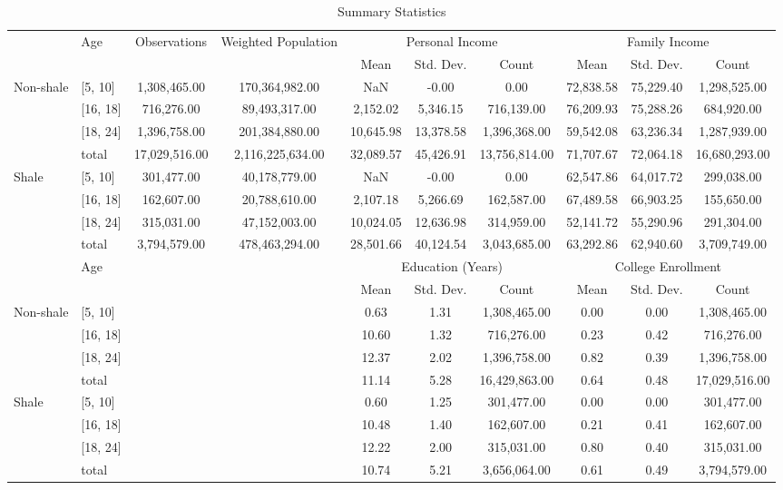 \begin{table}[ht]
\centering
\tiny
\begin{tabular}{l|l||c|c|ccc|ccc}
  \hline 
 & Age  & Observations & Weighted Population & \multicolumn{3}{c|}{Personal Income} & \multicolumn{3}{c}{Family Income} \\ 
 &  & & & Mean & Std. Dev. & Count & Mean & Std. Dev. & Count\\ 
  \hline 
   \multirow{4}{*}{Non-shale} & [5, 10] & 1,308,465.00 & 170,364,982.00 & NaN & -0.00 & 0.00 & 72,838.58 & 75,229.40 & 1,298,525.00 \\ 
   & [16, 18] & 716,276.00 & 89,493,317.00 & 2,152.02 & 5,346.15 & 716,139.00 & 76,209.93 & 75,288.26 & 684,920.00 \\ 
   & [18, 24] & 1,396,758.00 & 201,384,880.00 & 10,645.98 & 13,378.58 & 1,396,368.00 & 59,542.08 & 63,236.34 & 1,287,939.00 \\ 
   & total & 17,029,516.00 & 2,116,225,634.00 & 32,089.57 & 45,426.91 & 13,756,814.00 & 71,707.67 & 72,064.18 & 16,680,293.00 \\ 
   \multirow{4}{*}{Shale} & [5, 10] & 301,477.00 & 40,178,779.00 & NaN & -0.00 & 0.00 & 62,547.86 & 64,017.72 & 299,038.00 \\ 
   & [16, 18] & 162,607.00 & 20,788,610.00 & 2,107.18 & 5,266.69 & 162,587.00 & 67,489.58 & 66,903.25 & 155,650.00 \\ 
   & [18, 24] & 315,031.00 & 47,152,003.00 & 10,024.05 & 12,636.98 & 314,959.00 & 52,141.72 & 55,290.96 & 291,304.00 \\ 
   & total & 3,794,579.00 & 478,463,294.00 & 28,501.66 & 40,124.54 & 3,043,685.00 & 63,292.86 & 62,940.60 & 3,709,749.00 \\ 
   \hline \hline
   & Age & \multirow{10}{*}{} & \multirow{10}{*}{}& \multicolumn{3}{c|}{Education (Years)} & \multicolumn{3}{c}{College Enrollment} \\ 
  & &  & & Mean & Std. Dev. & Count  & Mean & Std. Dev. & Count  \\ 
  \hline
   \multirow{4}{*}{Non-shale} & [5, 10] & &  & 0.63 & 1.31 & 1,308,465.00 & 0.00 & 0.00 & 1,308,465.00 \\ 
   & [16, 18] & &  & 10.60 & 1.32 & 716,276.00 & 0.23 & 0.42 & 716,276.00 \\ 
   & [18, 24] &  &  & 12.37 & 2.02 & 1,396,758.00 & 0.82 & 0.39 & 1,396,758.00 \\ 
   & total &  & & 11.14 & 5.28 & 16,429,863.00 & 0.64 & 0.48 & 17,029,516.00 \\ 
   \multirow{4}{*}{Shale}& [5, 10] &  &  & 0.60 & 1.25 & 301,477.00 & 0.00 & 0.00 & 301,477.00 \\ 
   & [16, 18] &  &  & 10.48 & 1.40 & 162,607.00 & 0.21 & 0.41 & 162,607.00 \\ 
   & [18, 24] &  &  & 12.22 & 2.00 & 315,031.00 & 0.80 & 0.40 & 315,031.00 \\ 
   & total &  &  & 10.74 & 5.21 & 3,656,064.00 & 0.61 & 0.49 & 3,794,579.00 \\ 
   \hline
\end{tabular}
\caption{Summary Statistics} 
\label{tab:sum_stat}
\end{table}
